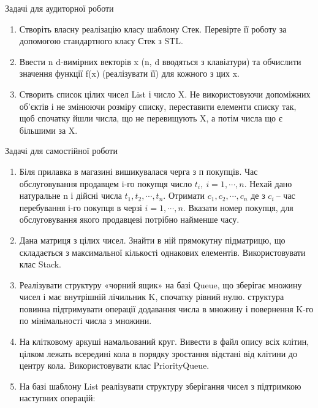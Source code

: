 \documentclass[]{article}
\makeatletter
\newcommand{\xslalph}[1]{\expandafter\@xslalph\csname c@#1\endcsname}
\newcommand{\@xslalph}[1]{%
    \ifcase#1\or а\or б\or в\or г\or д\or e\or є\or ж\or з\or i%
    \or й\or к\or л\or м\or н\or о\or п\or р\or с\or т%
    \or у\or ф\or х\or ц\or ч\or ш\or ю\or я\or аа\or бб\or вв%
    \else\@ctrerr\fi%
}
\makeatother
\begin{document}
\begin{enumerate}
\begin{enumerate}[label=\xslalph*)]
\begin{enumerate}
\begin{enumerate}[label=\xslalph*)]
\begin{enumerate}
\begin{enumerate}[label=\xslalph*)]
\begin{enumerate}
\begin{enumerate}[label=\xslalph*)]
Задачі для аудиторної роботи

\begin{enumerate}
\def\labelenumi{\arabic{enumi})}
\item
  Створіть власну реалізацію класу шаблону Стек. Перевірте її роботу за
  допомогою стандартного класу Стек з STL.
\item
  Ввести n d-вимірних векторів x (n, d вводяться з клавіатури) та
  обчислити значення функції f(x) (реалізувати її) для кожного з цих x.
 
   

\item
  Створить список цілих чисел List і число X. Не використовуючи
  допоміжних об'єктів і не змінюючи розміру списку, переставити елементи
  списку так, щоб спочатку йшли числа, що не перевищують X, а потім
  числа що є більшими за X.
\end{enumerate}

Задачі для самостійної роботи

\begin{enumerate}
\def\labelenumi{\arabic{enumi})}
\item
  Біля прилавка в магазині вишикувалася черга з п покупців. Час
  обслуговування продавцем i-го покупця число
  \(t_{i},\ i = 1,\cdots,n\). Нехай дано натуральне n і дійсні числа
  \(t_{1},t_{2},\cdots,t_{n}\). Отримати \(c_{1},c_{2},\cdots,c_{n}\) де
  з \(c_{i}\ \)-- час перебування i-го покупця в черзі
  \(i = 1,\cdots,n\). Вказати номер покупця, для обслуговування якого
  продавцеві потрібно найменше часу.
\item
  Дана матриця з цілих чисел. Знайти в ній прямокутну підматрицю, що
  складається з максимальної кількості однакових елементів.
  Використовувати клас Stack.
\item
  Реалізувати структуру «чорний ящик» на базі Queue, що зберігає множину
  чисел і має внутрішній лічильник K, спочатку рівний нулю. структура
  повинна підтримувати операції додавання числа в множину і повернення
  K-го по мінімальності числа з множини.
\item
  На клітковому аркуші намальований круг. Вивести в файл опису всіх
  клітин, цілком лежать всередині кола в порядку зростання відстані від
  клітини до центру кола. Використовувати клас PriorityQueue.
\item
  На базі шаблону List реалізувати структуру зберігання чисел з
  підтримкою наступних операцій:


\end{enumerate}
\end{enumerate}
\end{enumerate}
\end{enumerate}
\end{enumerate}
\end{enumerate}
\end{enumerate}
\end{enumerate}
\end{enumerate}
\end{document}
